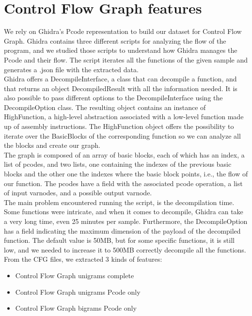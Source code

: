 \section{Control Flow Graph features}


We rely on Ghidra's Pcode representation to build our dataset for Control Flow Graph. Ghidra contains three different scripts for analyzing the flow of the program, and we studied those scripts to understand how Ghidra manages the Pcode and their flow. The script iterates all the functions of the given sample and generates a .json file with the extracted data.\\

Ghidra offers a DecompileInterface, a class that can decompile a function, and that returns an object DecompiledResult with all the information needed. It is also possible to pass different options to the DecompileInterface using the DecompileOption class. The resulting object contains an instance of HighFunction, a high-level abstraction associated with a low-level function made up of assembly instructions. The HighFunction object offers the possibility to iterate over the BasicBlocks of the corresponding function so we can analyze all the blocks and create our graph.\\

The graph is composed of an array of basic blocks, each of which has an index, a list of pcodes, and two lists, one containing the indexes of the previous basic blocks and the other one the indexes where the basic block points, i.e., the flow of our function. The pcodes have a field with the associated pcode operation, a list of input varnodes, and a possible output varnode. \\

The main problem encountered running the script, is the decompilation time. Some functions were intricate, and when it comes to decompile, Ghidra can take a very long time, even 25 minutes per sample.  Furthermore, the DecompileOption has a field indicating the maximum dimension of the payload of the decompiled function. The default value is 50MB, but for some specific functions, it is still low, and we needed to increase it to 500MB correctly decompile all the functions.  \\

From the CFG files, we extracted 3 kinds of features:
\begin{itemize}
	\item {Control Flow Graph unigrams complete}
	\item {Control Flow Graph unigrams Pcode only}
	\item {Control Flow Graph bigrams Pcode only}
\end{itemize}

